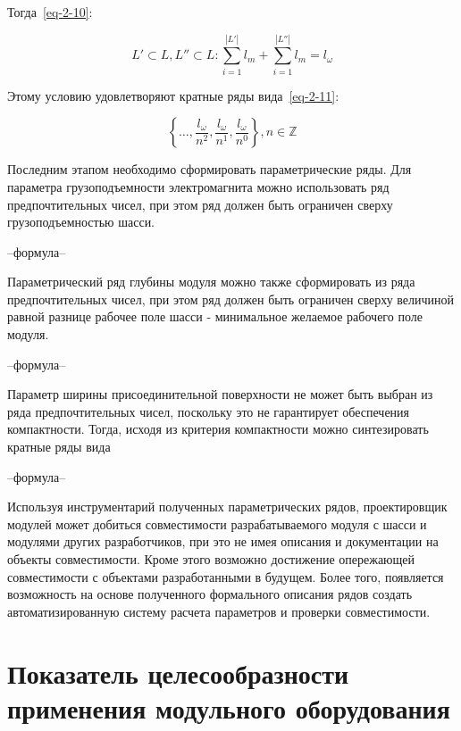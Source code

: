 \noindent Тогда~\cref{eq-2-10}:

\begin{equation}
L' \subset L, L'' \subset L: \sum_{i=1}^{|L'|}l_m + \sum_{i=1}^{|L''|}l_m = l_\omega
\label{eq-2-10}
\end{equation}

Этому условию удовлетворяют кратные ряды вида~\cref{eq-2-11}:

\begin{equation}
\left \{ \ldots, \frac{l_\omega}{n^2}, \frac{l_\omega}{n^1}, \frac{l_\omega}{n^0} \right \}, n \in \mathbb{Z}
\label{eq-2-11}
\end{equation}


Последним этапом необходимо сформировать параметрические ряды. Для параметра грузоподъемности электромагнита можно использовать ряд предпочтительных чисел, при этом ряд должен быть ограничен сверху грузоподъемностью шасси.

--формула--

Параметрический ряд глубины модуля можно также сформировать из ряда предпочтительных чисел, при этом ряд должен быть ограничен сверху величиной равной разнице  рабочее поле шасси - минимальное желаемое рабочего поле модуля.

--формула--

Параметр ширины присоединительной поверхности не может быть выбран из  ряда предпочтительных чисел, поскольку это не гарантирует обеспечения компактности. Тогда, исходя из критерия компактности можно синтезировать кратные ряды вида 

--формула--

Используя инструментарий полученных параметрических рядов, проектировщик модулей может добиться совместимости разрабатываемого модуля с шасси и модулями других разработчиков, при это не имея описания и документации на объекты совместимости. Кроме этого возможно достижение опережающей совместимости с объектами разработанными в будущем. Более того, появляется возможность на основе полученного формального описания рядов создать автоматизированную систему расчета параметров и проверки совместимости.

\section{Показатель целесообразности применения модульного оборудования}


